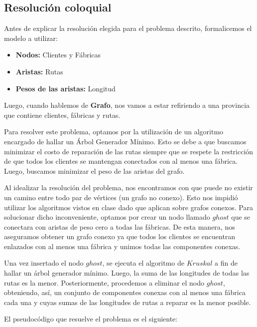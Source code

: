 \subsection{Resolución coloquial}

Antes de explicar la resolución elegida para el problema descrito, formalicemos el modelo a utilizar:
\begin{itemize}
\item  \textbf{Nodos:} Clientes y Fábricas
\item  \textbf{Aristas:} Rutas
\item  \textbf{Pesos de las aristas:} Longitud
\end{itemize}

Luego, cuando hablemos de \textbf{Grafo}, nos vamos a estar refiriendo a una provincia que contiene clientes, fábricas y rutas.\newline

Para resolver este problema, optamos por la utilización de un algoritmo encargado de hallar un Árbol Generador Mínimo. Esto se debe a que buscamos minimizar el costo de reparación de las rutas siempre que se respete la restricción de que todos los clientes se mantengan conectados con al menos una fábrica. Luego, buscamos minimizar el peso de las aristas del grafo.\newline

Al idealizar la resolución del problema, nos encontramos con que puede no existir un camino entre todo par de vértices (un grafo no conexo). Esto nos impidió utilizar los algoritmos vistos en clase dado que aplican sobre grafos conexos. Para solucionar dicho inconveniente, optamos por crear un nodo llamado $ghost$ que se conectara con aristas de peso cero a todas las fábricas. De esta manera, nos aseguramos obtener un grafo conexo ya que todos los clientes se encuentran enlazados con al menos una fábrica y unimos todas las componentes conexas.\newline

Una vez insertado el nodo $ghost$, se ejecuta el algoritmo de $Kruskal$ a fin de hallar un árbol generador mínimo. Luego, la suma de las longitudes de todas las rutas es la menor. Posteriormente, procedemos a eliminar el nodo $ghost$, obteniendo, así, un conjunto de componentes conexas con al menos una fábrica cada una y cuyas sumas de las longitudes de rutas a reparar es la menor posible.\newline

El pseudocódigo que resuelve el problema es el siguiente:\newline

